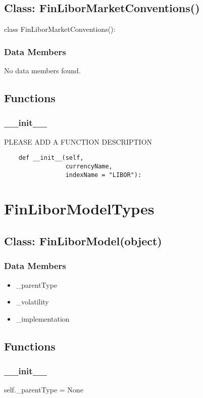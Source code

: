 \documentclass[twoside,11pt]{book}
\begin{document}
\subsection*{Class: FinLiborMarketConventions()}
class FinLiborMarketConventions(): 

\subsubsection*{Data Members}
No data members found.

\subsection*{Functions}

\subsubsection*{{\bf \_\_init\_\_}}
PLEASE ADD A FUNCTION DESCRIPTION

\begin{lstlisting}
    def __init__(self,
                 currencyName,
                 indexName = "LIBOR"):
\end{lstlisting}

\newpage
\section{FinLiborModelTypes}

\subsection*{Class: FinLiborModel(object)}


\subsubsection*{Data Members}
\begin{itemize}
\item{\_parentType}
\item{\_volatility}
\item{\_implementation}
\end{itemize}

\subsection*{Functions}

\subsubsection*{{\bf \_\_init\_\_}}
self.\_parentType = None 
\end{document}
